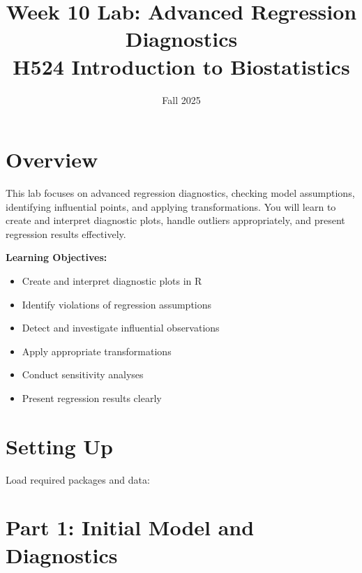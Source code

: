 \documentclass[11pt]{article}
\title{\textcolor{osaorange}{\textbf{Week 10 Lab: Advanced Regression Diagnostics}}\\
\large{H524 Introduction to Biostatistics}}
\author{}
\date{Fall 2025}
\begin{document}
\maketitle

\section*{Overview}
This lab focuses on advanced regression diagnostics, checking model assumptions, identifying influential points, and applying transformations. You will learn to create and interpret diagnostic plots, handle outliers appropriately, and present regression results effectively.

\textbf{Learning Objectives:}
\begin{itemize}
\item Create and interpret diagnostic plots in R
\item Identify violations of regression assumptions
\item Detect and investigate influential observations
\item Apply appropriate transformations
\item Conduct sensitivity analyses
\item Present regression results clearly
\end{itemize}

\section{Setting Up}

Load required packages and data:


\section{Part 1: Initial Model and Diagnostics}
\end{document}
